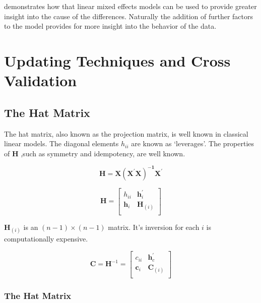 \documentclass[12pt, a4paper]{report}
\theoremstyle{plain}
\theoremstyle{definition}
\theoremstyle{remark}
\begin{document}
	\citet{LaiShiao} demonstrates how that linear mixed effects models
	can be used to provide greater insight into the cause of the
	differences. Naturally the addition of further factors to the
	model provides for more insight into the behavior of the data.
	
	\chapter{Updating Techniques and Cross Validation}
	
	\section{The Hat Matrix}
	The hat matrix, also known as the projection matrix, is well known in classical linear models. The diagonal elements $h_{ii}$ are known as `leverages'. The properties of $\boldsymbol{H}$  ,such as symmetry and idempotency, are well known.
	
	
	\begin{equation*}
	\boldsymbol{H} =  \boldsymbol{X(X^{\prime}X)^{-1}X^{\prime}}
	\end{equation*}
	
	
	\begin{equation*}
	\boldsymbol{H} = \left[%
	\begin{array}{cc}
	h_{ii} & \boldsymbol{h}^{\prime}_{i}\\
	\boldsymbol{h}_{i} & \boldsymbol{H}_{(i)}\\
	\end{array}%
	\right]
	\end{equation*}
	
	$\boldsymbol{H}_{(i)}$ is an $(n-1) \times (n-1)$ matrix. It's inversion for each $i$ is computationally expensive.
	
	\begin{equation*}
	\boldsymbol{C} = \boldsymbol{H}^{-1} =\left[%
	\begin{array}{cc}
	c_{ii} & \boldsymbol{h}^{\prime}_{c}\\
	\boldsymbol{c}_{i} & \boldsymbol{C}_{(i)}\\
	\end{array}%
	\right]
	\end{equation*}
	
	\subsection{The Hat Matrix} %
	
\end{document}
